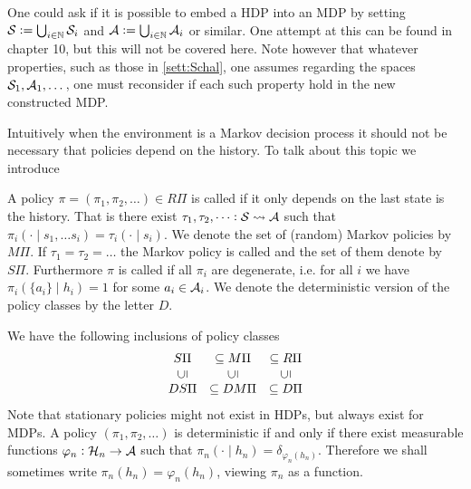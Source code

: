 \begin{rem}
  One could ask if it is possible to embed a HDP into an MDP
  by setting
  $\mathcal{S} \vcentcolon= \bigcup_{i\in\mathbb{N}} \mathcal{S}_i$ and
  $\mathcal{A} \vcentcolon= \bigcup_{i\in\mathbb{N}} \mathcal{A}_i$ or similar.
  One attempt at this can be found in  chapter 10,
  but this will not be covered here. %
  Note however that whatever properties, such as those in \cref{sett:Schal},
  one assumes regarding the spaces $\mathcal{S}_1, \mathcal{A}_1, \dots$, one must 
  reconsider if each such property hold in the new constructed MDP.
\end{rem}
Intuitively when the environment is a Markov decision process
it should not be necessary that policies depend on the history.
To talk about this topic we introduce

\begin{defn}
  A policy $\pi = (\pi_1, \pi_2, \dots) \in R\Pi$
  is called  if it
  only depends on the last state is the history.
  That is there exist $\tau_1, \tau_2, \dots : \mathcal{S} \leadsto \mathcal{A}$
  such that $\pi_i(\cdot \mid s_1, \dots s_i) = \tau_i(\cdot \mid s_i)$.
  We denote the set of (random) Markov policies by $M\Pi$.
  If $\tau_1 = \tau_2 = \dots$ the Markov policy is called
  and the set of them denote by $S\Pi$.
  Furthermore $\pi$ is called  if all $\pi_i$
  are degenerate, i.e. for all $i$ we have
  $\pi_i(\{a_i\} \mid h_i) = 1$ for some $a_i \in \mathcal{A}_{i}$.
  We denote the deterministic version of the policy classes
  by the letter $D$.
\end{defn}
\begin{rem} 
  We have the following inclusions of policy classes
  \[ \begin{matrix}
      S\Pi &\subseteq M\Pi &\subseteq R\Pi
      \\ \rleft{\subseteq} & \rleft{\subseteq} & \rleft{\subseteq} 
      \\ DS\Pi &\subseteq DM\Pi &\subseteq D\Pi
  \end{matrix} \] 
  Note that stationary policies might not exist
  in HDPs, but always exist for MDPs.
  A policy $(\pi_1, \pi_2, \dots)$ is deterministic
  if and only if there exist measurable
  functions $\varphi_n : \mathcal{H}_n \to \mathcal{A}$ such that
  $\pi_n(\cdot \mid h_n) = \delta_{\varphi_n(h_n)}$. Therefore we shall sometimes
  write $\pi_n(h_n) = \varphi_n(h_n)$, viewing $\pi_n$ as a function.
\end{rem}

